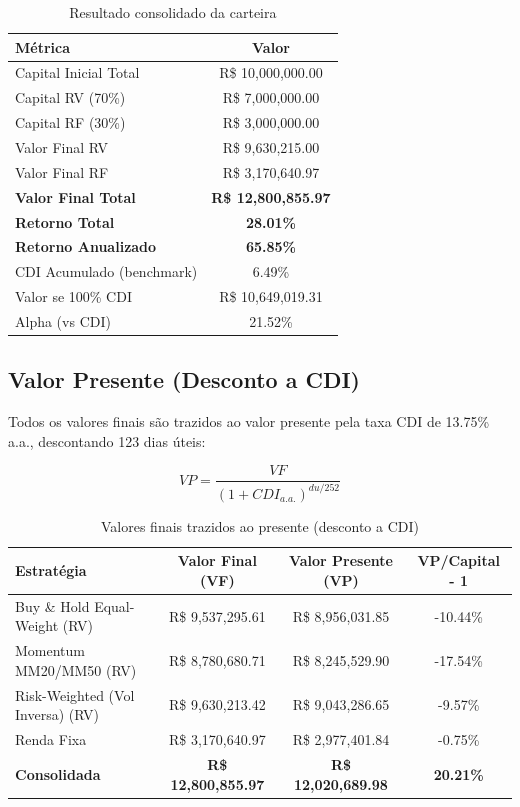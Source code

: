 \documentclass[a4paper, 12pt]{article}
\begin{document}
\begin{table}[H]
\centering
\caption{Resultado consolidado da carteira}
\label{tab:consolidado}
    \begin{tabular}{lc}
    \toprule
    \textbf{Métrica} & \textbf{Valor} \\
    \midrule
    Capital Inicial Total & R\$ 10,000,000.00 \\
    Capital RV (70\%) & R\$ 7,000,000.00 \\
    Capital RF (30\%) & R\$ 3,000,000.00 \\
    \midrule
    Valor Final RV & R\$ 9,630,215.00 \\
    Valor Final RF & R\$ 3,170,640.97 \\
    \midrule
    \textbf{Valor Final Total} & \textbf{R\$ 12,800,855.97} \\
    \textbf{Retorno Total} & \textbf{28.01\%} \\
    \textbf{Retorno Anualizado} & \textbf{65.85\%} \\
    \midrule
    CDI Acumulado (benchmark) & 6.49\% \\
    Valor se 100\% CDI & R\$ 10,649,019.31 \\
    Alpha (vs CDI) & 21.52\% \\
    \bottomrule
    \end{tabular}
\end{table}

\subsection{Valor Presente (Desconto a CDI)}

Todos os valores finais são trazidos ao valor presente pela taxa CDI de
13.75\% a.a., descontando 123 dias úteis:

$$VP = \frac{VF}{(1 + CDI_{a.a.})^{du / 252}}$$

\begin{table}[H]
\centering
\caption{Valores finais trazidos ao presente (desconto a CDI)}
\label{tab:valor_presente}
    \begin{tabular}{lccc}
    \toprule
    \textbf{Estratégia} & \textbf{Valor Final (VF)} & \textbf{Valor Presente (VP)} & \textbf{VP/Capital - 1} \\
    \midrule
        Buy \& Hold Equal-Weight (RV) & R\$ 9,537,295.61 & R\$ 8,956,031.85 & -10.44\% \\
        Momentum MM20/MM50 (RV) & R\$ 8,780,680.71 & R\$ 8,245,529.90 & -17.54\% \\
        Risk-Weighted (Vol Inversa) (RV) & R\$ 9,630,213.42 & R\$ 9,043,286.65 & -9.57\% \\
        Renda Fixa & R\$ 3,170,640.97 & R\$ 2,977,401.84 & -0.75\% \\
        \midrule
        \textbf{Consolidada} & \textbf{R\$ 12,800,855.97} & \textbf{R\$ 12,020,689.98} & \textbf{20.21\%} \\
    \bottomrule
    \end{tabular}
\end{table}
\end{document}
